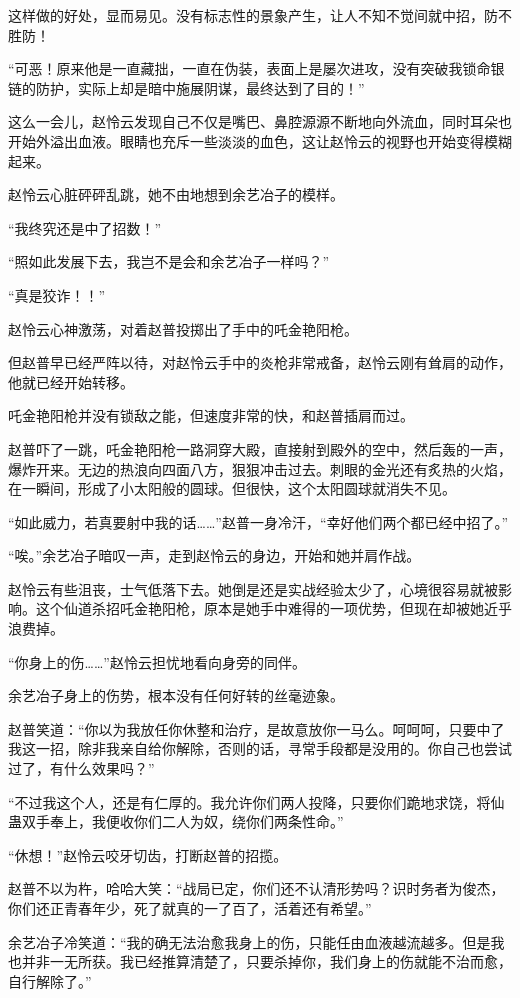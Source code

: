 \begin{this_body}
这样做的好处，显而易见。没有标志性的景象产生，让人不知不觉间就中招，防不胜防！

“可恶！原来他是一直藏拙，一直在伪装，表面上是屡次进攻，没有突破我锁命银链的防护，实际上却是暗中施展阴谋，最终达到了目的！”

这么一会儿，赵怜云发现自己不仅是嘴巴、鼻腔源源不断地向外流血，同时耳朵也开始外溢出血液。眼睛也充斥一些淡淡的血色，这让赵怜云的视野也开始变得模糊起来。

赵怜云心脏砰砰乱跳，她不由地想到余艺冶子的模样。

“我终究还是中了招数！”

“照如此发展下去，我岂不是会和余艺冶子一样吗？”

“真是狡诈！！”

赵怜云心神激荡，对着赵普投掷出了手中的吒金艳阳枪。

但赵普早已经严阵以待，对赵怜云手中的炎枪非常戒备，赵怜云刚有耸肩的动作，他就已经开始转移。

吒金艳阳枪并没有锁敌之能，但速度非常的快，和赵普插肩而过。

赵普吓了一跳，吒金艳阳枪一路洞穿大殿，直接射到殿外的空中，然后轰的一声，爆炸开来。无边的热浪向四面八方，狠狠冲击过去。刺眼的金光还有炙热的火焰，在一瞬间，形成了小太阳般的圆球。但很快，这个太阳圆球就消失不见。

“如此威力，若真要射中我的话……”赵普一身冷汗，“幸好他们两个都已经中招了。”

“唉。”余艺冶子暗叹一声，走到赵怜云的身边，开始和她并肩作战。

赵怜云有些沮丧，士气低落下去。她倒是还是实战经验太少了，心境很容易就被影响。这个仙道杀招吒金艳阳枪，原本是她手中难得的一项优势，但现在却被她近乎浪费掉。

“你身上的伤……”赵怜云担忧地看向身旁的同伴。

余艺冶子身上的伤势，根本没有任何好转的丝毫迹象。

赵普笑道：“你以为我放任你休整和治疗，是故意放你一马么。呵呵呵，只要中了我这一招，除非我亲自给你解除，否则的话，寻常手段都是没用的。你自己也尝试过了，有什么效果吗？”

“不过我这个人，还是有仁厚的。我允许你们两人投降，只要你们跪地求饶，将仙蛊双手奉上，我便收你们二人为奴，绕你们两条性命。”

“休想！”赵怜云咬牙切齿，打断赵普的招揽。

赵普不以为杵，哈哈大笑：“战局已定，你们还不认清形势吗？识时务者为俊杰，你们还正青春年少，死了就真的一了百了，活着还有希望。”

余艺冶子冷笑道：“我的确无法治愈我身上的伤，只能任由血液越流越多。但是我也并非一无所获。我已经推算清楚了，只要杀掉你，我们身上的伤就能不治而愈，自行解除了。”


\end{this_body}

